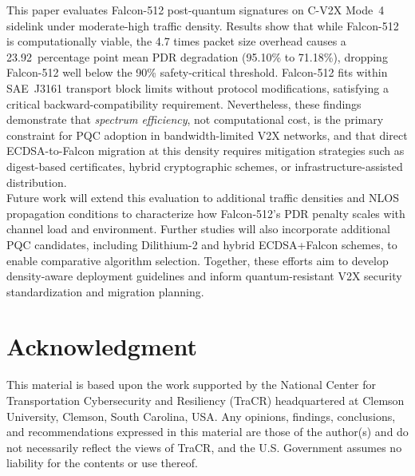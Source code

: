 \documentclass[conference]{IEEEtran}
\begin{document}



This paper evaluates Falcon-512 post-quantum signatures on C-V2X Mode~4 sidelink under moderate-high traffic density. Results show that while Falcon-512 is computationally viable, the 4.7 times packet size overhead causes a 23.92~percentage point mean PDR degradation (95.10\% to 71.18\%), dropping Falcon-512 well below the 90\% safety-critical threshold. Falcon-512 fits within SAE~J3161 transport block limits without protocol modifications, satisfying a critical backward-compatibility requirement. Nevertheless, these findings demonstrate that \emph{spectrum efficiency}, not computational cost, is the primary constraint for PQC adoption in bandwidth-limited V2X networks, and that direct ECDSA-to-Falcon migration at this density requires mitigation strategies such as digest-based certificates, hybrid cryptographic schemes, or infrastructure-assisted distribution.\\

Future work will extend this evaluation to additional traffic densities and NLOS propagation conditions to characterize how Falcon-512's PDR penalty scales with channel load and environment. Further studies will also incorporate additional PQC candidates, including Dilithium-2 and hybrid ECDSA+Falcon schemes, to enable comparative algorithm selection. Together, these efforts aim to develop density-aware deployment guidelines and inform quantum-resistant V2X security standardization and migration planning.

\section*{Acknowledgment}
This material is based upon the work supported by the National Center for Transportation Cybersecurity and Resiliency (TraCR) headquartered at Clemson University, Clemson, South Carolina, USA. Any opinions, findings, conclusions, and recommendations expressed in this material are those of the author(s) and do not necessarily reflect the views of TraCR, and the U.S. Government assumes no liability for the contents or use thereof.



\end{document}
